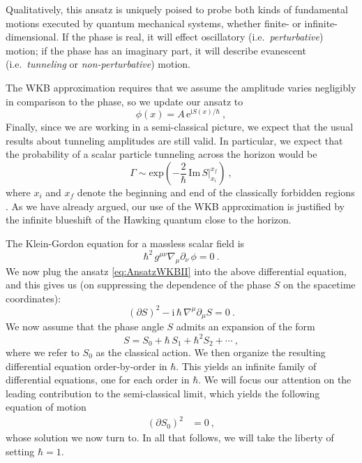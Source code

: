 \documentclass[a4paper,11pt]{article}
\newcommand{\ii}{\text{i}}
\newcommand{\e}[1]{\text{e}^{#1}}
\newcommand{\im}{\text{Im} \,}
\begin{document}
Qualitatively, this ansatz is uniquely poised to probe both kinds of fundamental motions executed by quantum mechanical systems, whether finite- or infinite-dimensional. If the phase is real, it will effect oscillatory (i.e.~\emph{perturbative}) motion; if the phase has an imaginary part, it will describe evanescent (i.e.~\emph{tunneling} or \emph{non-perturbative}) motion.

The WKB approximation requires that we assume the amplitude varies negligibly in comparison to the phase, so we update our ansatz to
\begin{equation}
\label{eq:AnsatzWKBII}
\phi(x) = A \, \e{\ii S(x)/\hbar} \ ,
\end{equation}
Finally, since we are working in a semi-classical picture, we expect that the usual results about tunneling amplitudes are still valid. In particular, we expect that the probability of a scalar particle tunneling across the horizon would be
\begin{equation}
\label{eq:TunnelingRate}
\Gamma \sim \text{exp}\left( -\frac{2}{\hbar} \, \im S\Big\vert^{x_f}_{x_i} \right) \ ,
\end{equation}
where $x_i$ and $x_f$ denote the beginning and end of the classically forbidden regions \cite{Parikh:2004ih}. As we have already argued, our use of the WKB approximation is justified by the infinite blueshift of the Hawking quantum close to the horizon.

The Klein-Gordon equation for a massless scalar field is
\begin{equation}
\hbar^2 \, g^{\mu \nu} \nabla_\mu \partial_\nu \, \phi = 0 \ .
\end{equation}
We now plug the ansatz \eqref{eq:AnsatzWKBII} into the above differential equation, and this gives us (on suppressing the dependence of the phase $S$ on the spacetime coordinates):
\begin{equation}
(\partial S)^2 - \ii \, \hbar \, \nabla^\mu \partial_\mu S = 0 \ .
\end{equation}
We now assume that the phase angle $S$ admits an expansion of the form
\begin{equation}
S = S_0 + \hbar \, S_1 + \hbar^2 S_2 + \cdots \ ,
\end{equation}
where we refer to $S_0$ as the classical action. We then organize the resulting differential equation order-by-order in $\hbar$. This yields an infinite family of differential equations, one for each order in $\hbar$. We will focus our attention on the leading contribution to the semi-classical limit, which yields the following equation of motion
\begin{align}
\label{eq:Hbar1}
\left( \partial S_0 \right)^2 &= 0 \ , 
\end{align}
whose solution we now turn to. In all that follows, we will take the liberty of setting $\hbar = 1$.
\end{document}
